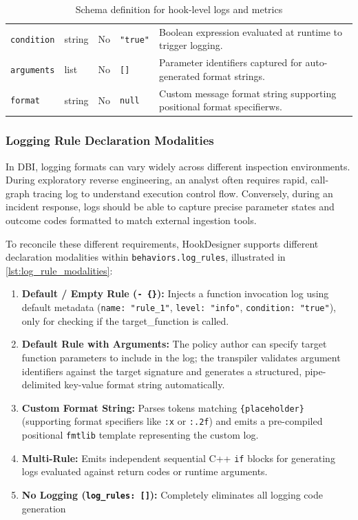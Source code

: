 \begin{table}[H]
\begin{tabularx}{\textwidth}{@{} l l l l X @{}}
		\texttt{condition}       & string & No  & \texttt{"true"} & Boolean expression evaluated at runtime to trigger logging. \\
		\texttt{arguments}       & list   & No  & \texttt{[]}    & Parameter identifiers captured for auto-generated format strings. \\
		\texttt{format}          & string & No  & \texttt{null}  & Custom message format string supporting positional format specifierws. \\
		\bottomrule
	\end{tabularx}
	\caption{Schema definition for hook-level logs and metrics}
	\label{tab:telemetry_behaviors_schema}
\end{table}

\subsubsection{Logging Rule Declaration Modalities}
\label{subsubsec:log_rule_modalities}

In \ac{DBI}, logging formats can vary widely across different inspection environments.
During exploratory reverse engineering, an analyst often requires rapid, call-graph tracing log to understand execution control flow.
Conversely, during an incident response, logs should be able to capture precise parameter states and outcome codes formatted to match external ingestion tools.

To reconcile these different requirements, HookDesigner supports different declaration modalities within \texttt{behaviors.log\_rules}, illustrated in \cref{lst:log_rule_modalities}:
\begin{enumerate}
	\item \textbf{Default / Empty Rule (\texttt{-\ \{\}}):} Injects a function invocation log using default metadata (\texttt{name: "rule\_1"}, \texttt{level: "info"}, \texttt{condition: "true"}), only for checking if the target\_function is called.
	\item \textbf{Default Rule with Arguments:} The policy author can specify target function parameters to include in the log; the transpiler validates argument identifiers against the target signature and generates a structured, pipe-delimited key-value format string automatically.
	\item \textbf{Custom Format String:} Parses tokens matching \texttt{\{placeholder\}} (supporting format specifiers like \texttt{:x} or \texttt{:.2f}) and emits a pre-compiled positional \texttt{fmtlib} template representing the custom log.
	\item \textbf{Multi-Rule:} Emits independent sequential C++ \texttt{if} blocks for generating logs evaluated against return codes or runtime arguments.
	\item \textbf{No Logging (\texttt{log\_rules:\ []}):} Completely eliminates all logging code generation
\end{enumerate}


